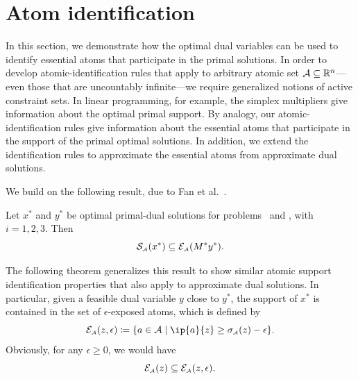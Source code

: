 \section{Atom identification} \label{sec:atom_iden}

In this section, we demonstrate how the optimal dual variables can be used to identify essential atoms that participate in the primal solutions. In order to develop atomic-identification rules that apply to arbitrary atomic set $\mathcal{A}\subseteq\mathbb{R}^n$---even those that are uncountably infinite---we require generalized notions of active constraint sets. In linear programming, for example, the simplex multipliers give information about the optimal primal support. By analogy, our atomic-identification rules give information about the essential atoms that participate in the support of the primal optimal solutions. In addition, we extend the identification rules to approximate the essential atoms from approximate dual solutions. 

We build on the following
result, due to Fan et al.~\cite[Proposition~4.5 and Theorem~5.1]{fan2019alignment}.
\begin{theorem}\label{thm:opt_supp_id} Let
  $x^*$ and $ y^*$ be optimal primal-dual solutions for problems \Probi~and \Drobi, with
  $i=1,2,3$. Then
  \[\operatorname{\mathcal{S}_{\scriptscriptstyle\mathcal{A}}}(x^*) \subseteq \mathcal{E}_{\scriptscriptstyle\mathcal{A}}(M^*y^*). \]
\end{theorem}

The following theorem generalizes this result to show similar atomic support identification properties that also apply to approximate dual solutions. In particular, given a feasible dual variable $y$ close to $y^*$, the support of $x^*$ is contained in the set of $\epsilon$-exposed atoms, which is defined by
\begin{equation}
  \Escr\As(z, \epsilon) \coloneqq \{a\in\Ascr \mid \ip{a}{z} \geq \sigma\As(z) - \epsilon\}.
\end{equation}
Obviously, for any $\epsilon \geq 0$, we would have 
\[\mathcal{E}_{\scriptscriptstyle\mathcal{A}}(z) \subseteq \mathcal{E}_{\scriptscriptstyle\mathcal{A}}(z, \epsilon).\]

